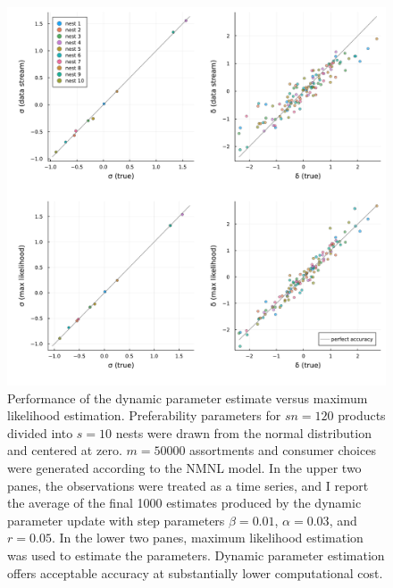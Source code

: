 \documentclass[preprint,12pt,authoryear]{elsarticle}
\begin{document}
\begin{figure}
\begin{center}\includegraphics[width=\linewidth, ]{../plots/param-est-dynamic-nested-as-static.pdf}\end{center}
\captionsetup{singlelinecheck=off}
    \caption[.]{Performance of the dynamic parameter estimate versus maximum likelihood estimation. Preferability parameters for $sn = 120$ products divided into $s=10$ nests were drawn from the normal distribution and centered at zero. $m=50000$ assortments and consumer choices were generated according to the NMNL model. In the upper two panes, the observations were treated as a time series, and I report the average of the final 1000 estimates produced by the dynamic parameter update with step parameters $\beta = 0.01$, $\alpha = 0.03$, and $r = 0.05$. In the lower two panes, maximum likelihood estimation was used to estimate the parameters. Dynamic parameter estimation offers acceptable accuracy at substantially lower computational cost.}
\label{param-est-dynamic-nested-as-static}
\end{figure}
\end{document}
